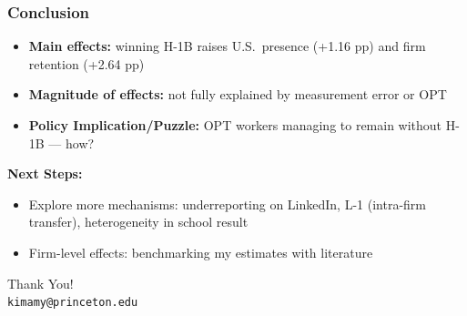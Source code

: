 \documentclass[xcolor=dvipsnames, compress, 12pt, aspectratio=169, presentation]{beamer}
\begin{document}
\begin{frame}
    \frametitle{Conclusion}
    \begin{itemize}
        \item \textbf{Main effects:} winning H-1B raises U.S.\ presence (+1.16 pp) and firm retention (+2.64 pp)
        \vspace{2mm}
        \item \textbf{Magnitude of effects:} not fully explained by measurement error or OPT
        \vspace{2mm}
        \item \textbf{Policy Implication/Puzzle:} OPT workers managing to remain without H-1B --- how? 
    \end{itemize} \vspace{2mm}
    
    \textbf{Next Steps:}
    \begin{itemize}
        \item Explore more mechanisms: underreporting on LinkedIn, L-1 (intra-firm transfer), heterogeneity in school result
        \item Firm-level effects: benchmarking my estimates with literature 
    \end{itemize}
\end{frame}

\begin{frame}
    \vfill
    \begin{center}
        \textcolor{maincolor}{{\Large Thank You!}}\\[4mm]
        {\small \texttt{kimamy@princeton.edu}}
    \end{center}
    \vfill
\end{frame}

\end{document}
